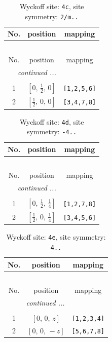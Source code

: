 \documentclass[fleqn,8pt]{jsarticle}
\begin{document}
\begin{longtable}{ccc}
\caption{Wyckoff site: {\tt 4c}, site symmetry: {\tt 2/m..}}
 \\
 \hline \hline
No. & position & mapping \\ \hline \endfirsthead

\multicolumn{2}{l}{\tablename\ \thetable{}} \\
 \hline \hline
No. & position & mapping \\ \hline \endhead

 \hline \hline
\multicolumn{2}{r}{\footnotesize\it continued ...} \\ \endfoot

 \hline \hline
\multicolumn{2}{r}{} \\ \endlastfoot

1 & $\left[ 0,\, \frac{1}{2},\, 0 \right]$ & {\tt [1,2,5,6]} \\ \hline
2 & $\left[ \frac{1}{2},\, 0,\, 0 \right]$ & {\tt [3,4,7,8]} \\
\end{longtable}
\renewcommand{\arraystretch}{1.2}
\begin{longtable}{ccc}
\caption{Wyckoff site: {\tt 4d}, site symmetry: {\tt -4..}}
 \\
 \hline \hline
No. & position & mapping \\ \hline \endfirsthead

\multicolumn{2}{l}{\tablename\ \thetable{}} \\
 \hline \hline
No. & position & mapping \\ \hline \endhead

 \hline \hline
\multicolumn{2}{r}{\footnotesize\it continued ...} \\ \endfoot

 \hline \hline
\multicolumn{2}{r}{} \\ \endlastfoot

1 & $\left[ 0,\, \frac{1}{2},\, \frac{1}{4} \right]$ & {\tt [1,2,7,8]} \\ \hline
2 & $\left[ \frac{1}{2},\, 0,\, \frac{1}{4} \right]$ & {\tt [3,4,5,6]} \\
\end{longtable}
\renewcommand{\arraystretch}{1.2}
\begin{longtable}{ccc}
\caption{Wyckoff site: {\tt 4e}, site symmetry: {\tt 4..}}
 \\
 \hline \hline
No. & position & mapping \\ \hline \endfirsthead

\multicolumn{2}{l}{\tablename\ \thetable{}} \\
 \hline \hline
No. & position & mapping \\ \hline \endhead

 \hline \hline
\multicolumn{2}{r}{\footnotesize\it continued ...} \\ \endfoot

 \hline \hline
\multicolumn{2}{r}{} \\ \endlastfoot

1 & $\left[ 0,\, 0,\, z \right]$ & {\tt [1,2,3,4]} \\ \hline
2 & $\left[ 0,\, 0,\, - z \right]$ & {\tt [5,6,7,8]} \\
\end{longtable}
\end{document}
